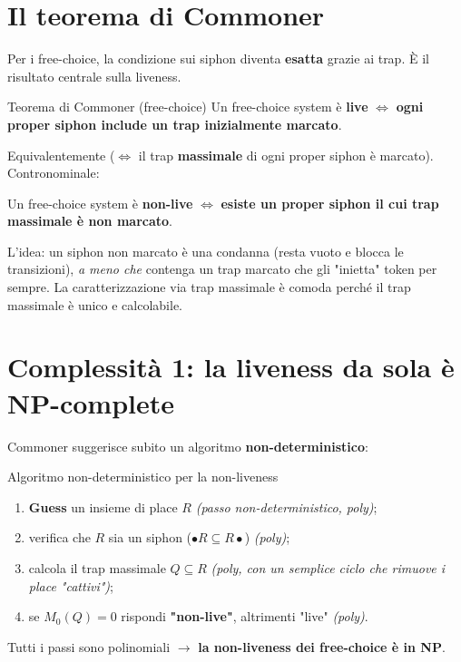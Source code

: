 \section{\texorpdfstring{Il teorema di Commoner}{Il teorema di Commoner}}

Per i free-choice, la condizione sui siphon diventa \textbf{esatta} grazie ai trap. È il risultato centrale sulla liveness.

\begin{boxtheorem}{Teorema di Commoner (free-choice)}
Un free-choice system è \textbf{live} $\iff$ \textbf{ogni proper siphon include un trap inizialmente marcato}.

Equivalentemente ($\iff$ il trap \textbf{massimale} di ogni proper siphon è marcato). Contronominale:

Un free-choice system è \textbf{non-live} $\iff$ \textbf{esiste un proper siphon il cui trap massimale è non marcato}.
\end{boxtheorem}

L'idea: un siphon non marcato è una condanna (resta vuoto e blocca le transizioni), \emph{a meno che} contenga un trap marcato che gli "inietta" token per sempre. La caratterizzazione via trap massimale è comoda perché il trap massimale è unico e calcolabile.

\section{\texorpdfstring{Complessità 1: la liveness da sola è NP-complete}{Complessità 1: la liveness da sola è NP-complete}}

Commoner suggerisce subito un algoritmo \textbf{non-deterministico}:

\begin{boxnote}{Algoritmo non-deterministico per la non-liveness}
\begin{enumerate}
\item \textbf{Guess} un insieme di place $R$ \emph{(passo non-deterministico, poly)};
\item verifica che $R$ sia un siphon ($\bullet R \subseteq R\bullet$) \emph{(poly)};
\item calcola il trap massimale $Q \subseteq R$ \emph{(poly, con un semplice ciclo che rimuove i place "cattivi")};
\item se $M_0(Q) = 0$ rispondi \textbf{"non-live"}, altrimenti "live" \emph{(poly)}.
\end{enumerate}

Tutti i passi sono polinomiali $\rightarrow$ \textbf{la non-liveness dei free-choice è in NP}.
\end{boxnote}


